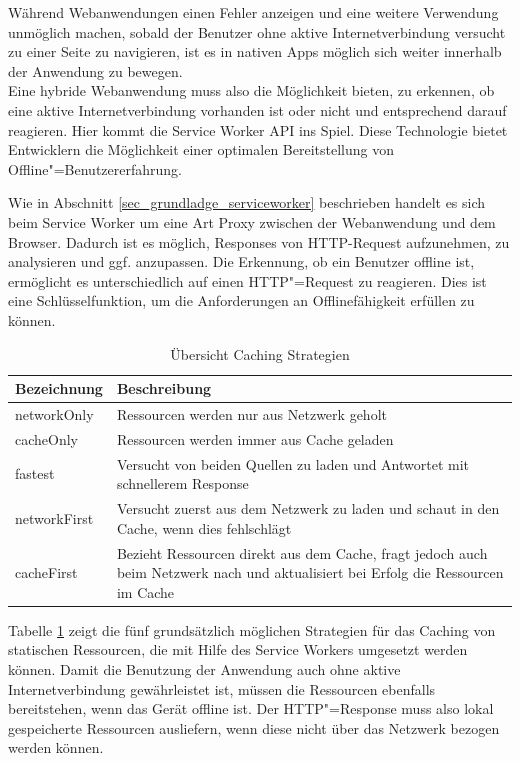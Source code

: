 Während Webanwendungen einen Fehler anzeigen und eine weitere Verwendung unmöglich machen, sobald der Benutzer ohne aktive Internetverbindung versucht zu einer Seite zu navigieren, ist es in nativen Apps möglich sich weiter innerhalb der Anwendung zu bewegen. \\
Eine hybride Webanwendung muss also die Möglichkeit bieten, zu erkennen, ob eine aktive Internetverbindung vorhanden ist oder nicht und entsprechend darauf reagieren. Hier kommt die Service Worker API ins Spiel. Diese Technologie bietet Entwicklern die Möglichkeit einer optimalen Bereitstellung von Offline"=Benutzererfahrung.   

Wie in Abschnitt \ref{sec_grundladge_serviceworker} beschrieben handelt es sich beim Service Worker um eine Art Proxy zwischen der Webanwendung und dem Browser. Dadurch ist es möglich, Responses von HTTP-Request aufzunehmen, zu analysieren und ggf. anzupassen. Die Erkennung, ob ein Benutzer offline ist, ermöglicht es unterschiedlich auf einen HTTP"=Request zu reagieren. Dies ist eine Schlüsselfunktion, um die Anforderungen an Offlinefähigkeit erfüllen zu können.\\

\begin{table}[h]
\def\arraystretch{1.5}%
\centering
\begin{tabularx}{\textwidth}{| l | X | }
    \hline
    \textbf{Bezeichnung} & \textbf{Beschreibung} \\
    \hline
    networkOnly & Ressourcen werden nur aus Netzwerk geholt \\
    \hline    
    cacheOnly & Ressourcen werden immer aus Cache geladen \\
    \hline
    fastest & Versucht von beiden Quellen zu laden und Antwortet mit schnellerem Response \\
    \hline
    networkFirst & Versucht zuerst aus dem Netzwerk zu laden und schaut in den Cache, wenn dies fehlschlägt \\
    \hline
    cacheFirst & Bezieht Ressourcen direkt aus dem Cache, fragt jedoch auch beim Netzwerk nach und aktualisiert bei Erfolg die Ressourcen im Cache \\
    \hline
\end{tabularx}
\caption{Übersicht Caching Strategien}
\label{tbl_konzeption_caching-strategien}
\end{table}

Tabelle \ref{tbl_konzeption_caching-strategien} zeigt die fünf grundsätzlich möglichen Strategien für das Caching von statischen Ressourcen, die mit Hilfe des Service Workers umgesetzt werden können. Damit die Benutzung der Anwendung auch ohne aktive Internetverbindung gewährleistet ist, müssen die Ressourcen ebenfalls bereitstehen, wenn das Gerät offline ist. Der HTTP"=Response muss also lokal gespeicherte Ressourcen ausliefern, wenn diese nicht über das Netzwerk bezogen werden können. \\

